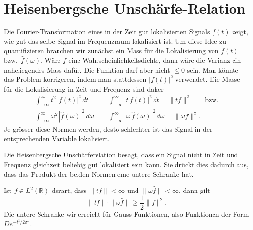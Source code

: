 %
%
%
\section{Heisenbergsche Unschärfe-Relation
\label{section:heisenberg}}
Die Fourier-Transformation eines in der Zeit gut lokalisierten
Signals $f(t)$ zeigt, wie gut das selbe Signal im Frequenzraum
lokalisiert ist.
Um diese Idee zu quantifizieren brauchen wir zunächst ein Mass für
die Lokalisierung von $f(t)$ bzw.~$\hat{f}(\omega)$.
Wäre $f$ eine Wahrscheinlichkeitsdichte, dann wäre die Varianz ein
naheliegendes Mass dafür.
Die Funktion darf aber nicht $\le 0$ sein. Man könnte das Problem korrigeren, indem man stattdessen $|f(t)|^2$ verwendet.
Die Masse für die Lokalisierung in Zeit und Frequenz sind daher
\begin{align*}
\int_{-\infty}^\infty
t^2 \, |f(t)|^2\,dt
&=
\int_{-\infty}^\infty
|t\,f(t)|^2\,dt
=
\|tf\|^2
\qquad\text{bzw.}
\\
\int_{-\infty}^\infty
\omega^2\,|\hat{f}(\omega)|^2\,d\omega
&=
\int_{-\infty}^\infty
|\omega\,\hat{f}(\omega)|^2\,d\omega
=
\|\omega \hat{f}\|^2.
\end{align*}
Je grösser diese Normen werden, desto schlechter ist das Signal in der
entsprechenden Variable lokalisiert.

Die Heisenbergsche Unschärferelation besagt, dass ein Signal nicht
in Zeit und Frequenz gleichzeit beliebig gut lokalisiert sein kann.
Sie drückt dies dadurch aus, dass das Produkt der beiden Normen 
eine untere Schranke hat.

\begin{satz}[Heisenberg]
\label{satz:heisenberg}
Ist $f\in L^2(\mathbb R)$ derart, dass 
$\|tf\|<\infty$ und $\|\omega\hat{f}\|<\infty$, dann gilt
\begin{equation}
\| tf \| \cdot \| \omega \hat{f}\| \ge \frac12\| f\|^2.
\label{heisenberg:gleichung}
\end{equation}
Die untere Schranke wir erreicht für Gauss-Funktionen, also Funktionen
der Form $De^{-t^2/2\sigma^2}$.
\end{satz}


